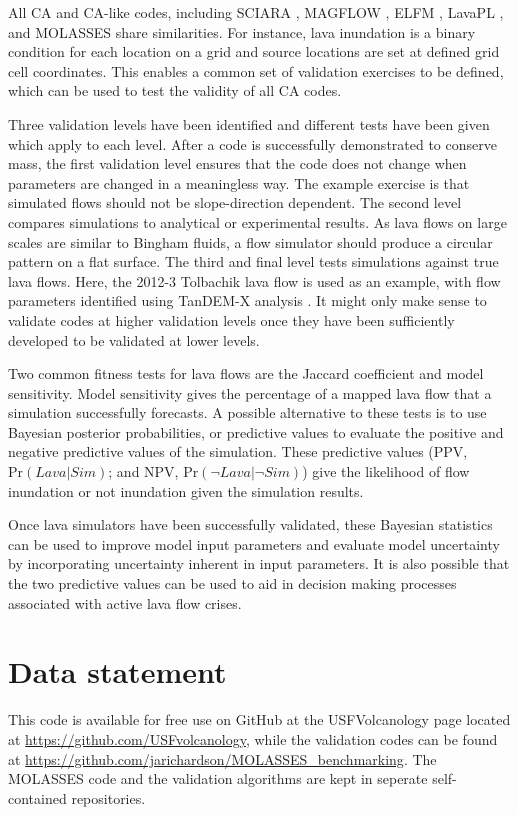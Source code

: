 	All CA and CA-like codes, including SCIARA \citep{crisci2004simulation}, MAGFLOW \citep{del2008simulations}, ELFM \citep{damiani2006lava}, LavaPL \citep{connor2012probabilistic}, and MOLASSES share similarities. For instance, lava inundation is a binary condition for each location on a grid and source locations are set at defined grid cell coordinates. This enables a common set of validation exercises to be defined, which can be used to test the validity of all CA codes.
	
	Three validation levels have been identified and different tests have been given which apply to each level. After a code is successfully demonstrated to conserve mass, the first validation level ensures that the code does not change when parameters are changed in a meaningless way. The example exercise is that simulated flows should not be slope-direction dependent. The second level compares simulations to analytical or experimental results. As lava flows on large scales are similar to Bingham fluids, a flow simulator should produce a circular pattern on a flat surface. The third and final level tests simulations against true lava flows. Here, the 2012-3 Tolbachik lava flow is used as an example, with flow parameters identified using TanDEM-X analysis \citep{kubanek2015lava}. It might only make sense to validate codes at higher validation levels once they have been sufficiently developed to be validated at lower levels.
	
	Two common fitness tests for lava flows are the Jaccard coefficient and model sensitivity. Model sensitivity gives the percentage of a mapped lava flow that a simulation successfully forecasts. A possible alternative to these tests is to use Bayesian posterior probabilities, or predictive values to evaluate the positive and negative predictive values of the simulation. These predictive values (PPV, $\text{Pr}(Lava|Sim)$; and NPV, $\text{Pr}(\neg Lava|\neg Sim)$) give the likelihood of flow inundation or not inundation given the simulation results.
	
	Once lava simulators have been successfully validated, these Bayesian statistics can be used to improve model input parameters and evaluate model uncertainty by incorporating uncertainty inherent in input parameters. It is also possible that the two predictive values can be used to aid in decision making processes associated with active lava flow crises.
	
	
\section{Data statement}
This code is available for free use on GitHub at the USFVolcanology page located at \url{https://github.com/USFvolcanology}, while the validation codes can be found at \url{https://github.com/jarichardson/MOLASSES_benchmarking}. The MOLASSES code and the validation algorithms are kept in seperate self-contained repositories.

